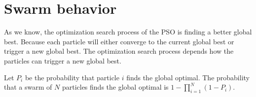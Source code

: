 \section{Swarm behavior}

As we know, the optimization search process of the PSO is finding a better global best.
Because each particle will either converge to the current global best or trigger a new global best.
The optimization search process depends how the particles can trigger a new global best.

\begin{lemma}
Let $ P_{i} $ be the probability that particle $ i $ finds the global optimal.
The probability that a swarm of $ N $ particles finds the global optimal is
$ 1 - \prod_{i=1}^{N} (1 - P_{i}) $.
\end{lemma}